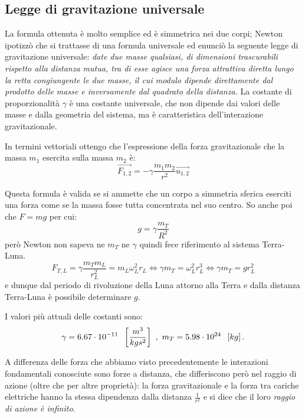 \documentclass[class=book, crop=false, oneside, 12pt]{standalone}
\begin{document}
\subsection{Legge di gravitazione universale}

La formula ottenuta è molto semplice ed è simmetrica nei due corpi; 
Newton ipotizzò che si trattasse di una formula universale ed enunciò la seguente legge di gravitazione universale: \newline
\emph{date due masse qualsiasi, di dimensioni trascurabili rispetto alla distanza mutua, tra di esse agisce una forza attrattiva diretta lungo la retta congiungente le due masse, il cui modulo dipende direttamente dal prodotto delle masse e inversamente dal quadrato della distanza.}\newline
La costante di proporzionalità \(\gamma\) è una costante universale, che non dipende dai valori delle masse e dalla geometria del sistema, ma è caratteristica dell'interazione gravitazionale.

In termini vettoriali ottengo che l'espressione della forza gravitazionale che la massa \(m_1\) esercita sulla massa \(m_2\) è:
\begin{equation}
    \overrightarrow{F_{1,2}} = - \gamma \frac{m_1 m_2}{r^2} \overrightarrow{u_{1,2}}
\end{equation}

Questa formula è valida se si ammette che un corpo a simmetria sferica eserciti una forza come se la massa fosse tutta concentrata nel suo centro.
So anche poi che \(F = mg\) per cui:
\begin{equation}
    g = \gamma \frac{m_T}{R^2}
\end{equation}
però Newton non sapeva ne \(m_T\) ne \(\gamma\) quindi fece riferimento al sistema Terra-Luna.
\begin{equation}
    F_{T,L} = \gamma \frac{m_T m_L}{r_L^2} = m_L \omega_L^2 r_L \Leftrightarrow \gamma m_T = \omega_L^2 r_L^3 \Leftrightarrow \gamma m_T = g r_L^2
\end{equation}
e dunque dal periodo di rivoluzione della Luna attorno alla Terra e dalla distanza Terra-Luna è possibile determinare \(g\).

I valori più attuali delle costanti sono:
\begin{equation*}
    \gamma = 6.67 \cdot 10^{-11} \hspace{0.2cm} \left[\frac{m^3}{kg s^2}\right] \ , \ m_T = 5.98 \cdot 10^{24} \hspace{0.2cm} \left[kg\right] .
\end{equation*}

A differenza delle forza che abbiamo visto precedentemente le interazioni fondamentali conosciute sono forze a distanza, che differiscono però nel raggio di azione (oltre che per altre proprietà): 
la forza gravitazionale e la forza tra cariche elettriche hanno la stessa dipendenza dalla distanza $\frac{1}{r^2}$ e si dice che il loro \emph{raggio di azione è infinito}.
\end{document}
